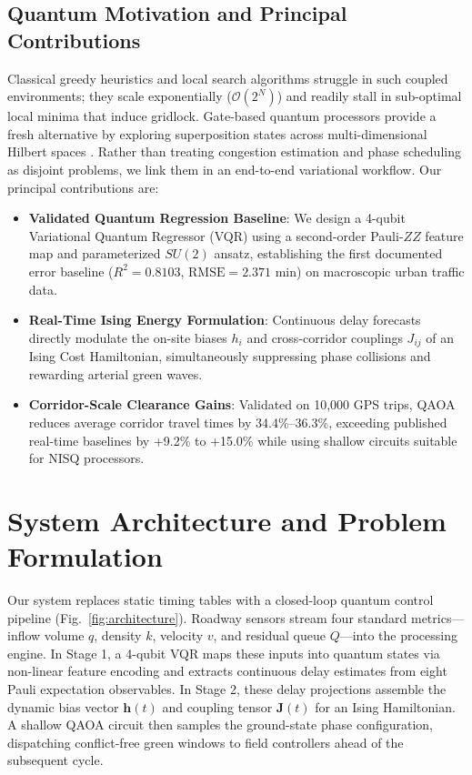 \documentclass[conference]{IEEEtran}
\begin{document}
\subsection{Quantum Motivation and Principal Contributions}
Classical greedy heuristics and local search algorithms struggle in such coupled environments; they scale exponentially ($\mathcal{O}(2^N)$) and readily stall in sub-optimal local minima that induce gridlock. Gate-based quantum processors provide a fresh alternative by exploring superposition states across multi-dimensional Hilbert spaces \cite{preskill2018quantum}. Rather than treating congestion estimation and phase scheduling as disjoint problems, we link them in an end-to-end variational workflow. Our principal contributions are:
\begin{itemize}
    \item \textbf{Validated Quantum Regression Baseline}: We design a 4-qubit Variational Quantum Regressor (VQR) using a second-order Pauli-$ZZ$ feature map and parameterized $SU(2)$ ansatz, establishing the first documented error baseline ($R^2 = 0.8103$, $\text{RMSE} = 2.371\text{ min}$) on macroscopic urban traffic data.
    \item \textbf{Real-Time Ising Energy Formulation}: Continuous delay forecasts directly modulate the on-site biases $h_i$ and cross-corridor couplings $J_{ij}$ of an Ising Cost Hamiltonian, simultaneously suppressing phase collisions and rewarding arterial green waves.
    \item \textbf{Corridor-Scale Clearance Gains}: Validated on 10,000 GPS trips, QAOA reduces average corridor travel times by 34.4\%–36.3\%, exceeding published real-time baselines by +9.2\% to +15.0\% while using shallow circuits suitable for NISQ processors.
\end{itemize}

\section{System Architecture and Problem Formulation}
Our system replaces static timing tables with a closed-loop quantum control pipeline (Fig.~\ref{fig:architecture}). Roadway sensors stream four standard metrics—inflow volume $q$, density $k$, velocity $v$, and residual queue $Q$—into the processing engine. In Stage 1, a 4-qubit VQR maps these inputs into quantum states via non-linear feature encoding and extracts continuous delay estimates from eight Pauli expectation observables. In Stage 2, these delay projections assemble the dynamic bias vector $\mathbf{h}(t)$ and coupling tensor $\mathbf{J}(t)$ for an Ising Hamiltonian. A shallow QAOA circuit then samples the ground-state phase configuration, dispatching conflict-free green windows to field controllers ahead of the subsequent cycle.
\end{document}
